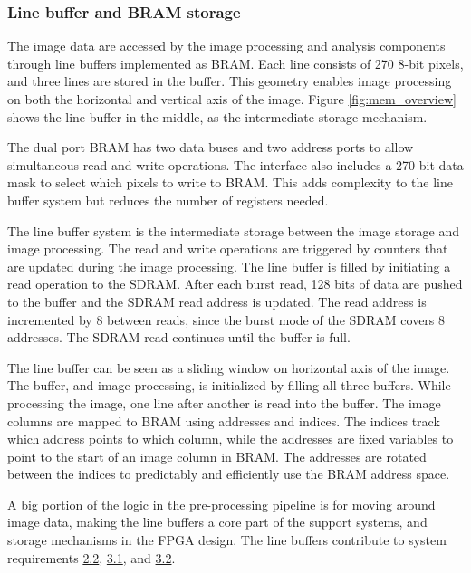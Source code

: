 \documentclass[12pt]{report}
\begin{document}
\subsubsection{Line buffer and BRAM storage}
The image data are accessed by the image processing and analysis components through line buffers implemented as BRAM. Each line consists of 270 8-bit pixels, and three lines are stored in the buffer. This geometry enables image processing on both the horizontal and vertical axis of the image. Figure \ref*{fig:mem_overview} shows the line buffer in the middle, as the intermediate storage mechanism.
\par
The dual port BRAM has two data buses and two address ports to allow simultaneous read and write operations. The interface also includes a 270-bit data mask to select which pixels to write to BRAM. This adds complexity to the line buffer system but reduces the number of registers needed.
\par
The line buffer system is the intermediate storage between the image storage and image processing. The read and write operations are triggered by counters that are updated during the image processing. The line buffer is filled by initiating a read operation to the SDRAM. After each burst read, 128 bits of data are pushed to the buffer and the SDRAM read address is updated. The read address is incremented by 8 between reads, since the burst mode of the SDRAM covers 8 addresses. The SDRAM read continues until the buffer is full.
\par
The line buffer can be seen as a sliding window on horizontal axis of the image. The buffer, and image processing, is initialized by filling all three buffers. While processing the image, one line after another is read into the buffer. The image columns are mapped to BRAM using addresses and indices. The indices track which address points to which column, while the addresses are fixed variables to point to the start of an image column in BRAM. The addresses are rotated between the indices to predictably and efficiently use the BRAM address space.
\par
A big portion of the logic in the pre-processing pipeline is for moving around image data, making the line buffers a core part of the support systems, and storage mechanisms in the FPGA design. The line buffers contribute to system requirements \hyperref[req2.2]{2.2}, \hyperref[req3.1]{3.1}, and \hyperref[req3.2]{3.2}.
\end{document}
